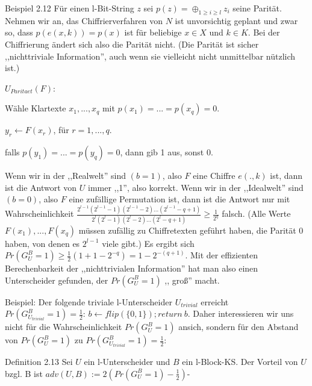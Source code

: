 \documentclass[a4paper]{article}
\begin{document}
\begin{multicols}{3}
    Beispiel 2.12 Für einen l-Bit-String $z$ sei $p(z)=\oplus_{1 \geq i\geq l} z_i$ seine Parität. Nehmen wir an, das Chiffrierverfahren von $N$ ist unvorsichtig geplant und zwar so, dass $p(e(x,k)) =p(x)$ ist für beliebige $x\in X$ und $k\in K$. Bei der Chiffrierung ändert sich also die Parität nicht. (Die Parität ist sicher ,,nichttriviale Information'', auch wenn sie vielleicht nicht unmittelbar nützlich ist.)

    $U_{Paritaet}(F)$:
    \begin{enumerate*}
        \item Wähle Klartexte $x_1,...,x_q$ mit $p(x_1)=...=p(x_q) = 0$.
        \item  $y_r\leftarrow F(x_r)$, für $r=1,...,q$.
        \item  falls $p(y_1)=...=p(y_q)=0$, dann gib 1 aus, sonst 0.
    \end{enumerate*}

    Wenn wir in der  ,,Realwelt''  sind $(b=1)$, also $F$ eine Chiffre $e(.,k)$ ist, dann ist die Antwort von $U$ immer ,,1'', also korrekt. Wenn wir in der ,,Idealwelt'' sind $(b=0)$, also $F$ eine zufällige Permutation ist, dann ist die Antwort nur mit Wahrscheinlichkeit $\frac{2^{l-1} (2^{l-1} -1)(2^{l-1}-2)...(2^{l-1} -q+ 1)}{2^l (2^l-1)(2^l-2)...(2^l-q+ 1)} \geq \frac{1}{2^q}$ falsch. (Alle Werte $F(x_1),...,F(x_q)$ müssen zufällig zu Chiffretexten geführt haben, die Parität 0 haben, von denen es $2^{l-1}$ viele gibt.) Es ergibt sich $Pr(G^B_U= 1)\geq\frac{1}{2} (1+1-2^{-q}) =1-2^{-(q+1)}$. Mit der effizienten Berechenbarkeit der ,,nichttrivialen Information'' hat man also einen Unterscheider gefunden, der $Pr(G^B_U=1)$ ,, groß'' macht.

    Beispiel: Der folgende triviale l-Unterscheider $U_{trivial}$ erreicht $Pr(G^B_{U_{trivial}}= 1)=\frac{1}{2}$: $b\leftarrow flip(\{0,1\}); return\ b$.
    Daher interessieren wir uns nicht für die Wahrscheinlichkeit $Pr(G^B_U= 1)$ ansich, sondern für den Abstand von $Pr(G^B_U=1)$ zu $Pr(G^B_{U_{trivial}}= 1) =\frac{1}{2}$:

    Definition 2.13 Sei $U$ ein l-Unterscheider und $B$ ein l-Block-KS. Der Vorteil von $U$ bzgl. B ist $adv(U,B):= 2(Pr(G^B_U=1)-\frac{1}{2})$-


\end{multicols}
\end{document}
